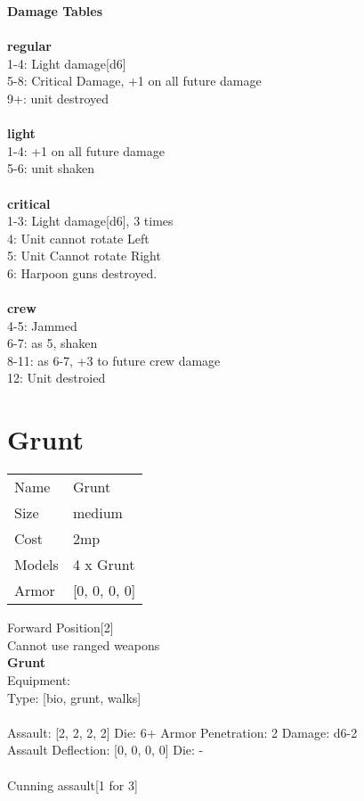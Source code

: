 {\bf Damage Tables} \\
\ \\ {\bf regular } \\
1-4: Light damage[d6] \\
5-8: Critical Damage, +1 on all future damage \\
9+: unit destroyed \\
\ \\ {\bf light } \\
1-4: +1 on all future damage \\
5-6: unit shaken \\
\ \\ {\bf critical } \\
1-3: Light damage[d6], 3 times \\
4: Unit cannot rotate Left \\
5: Unit Cannot rotate Right \\
6: Harpoon guns destroyed. \\
\ \\ {\bf crew } \\
4-5: Jammed \\
6-7: as 5, shaken \\
8-11: as 6-7, +3 to future crew damage \\
12: Unit destroied \\










\pagebreak\pagebreak

\section{ Grunt }

\begin{tabular}{ll}
  Name & Grunt \\
  Size & medium\\
  Cost & 2mp\\
  Models & 4 x Grunt\\
  Armor & [0, 0, 0, 0]\\
\end{tabular}

\noindent Forward Position[2]\\ 
Cannot use ranged weapons\\ 


{\bf Grunt } \\
Equipment:  \\
Type: [bio, grunt, walks] \\
\ \\
Assault: [2, 2, 2, 2] Die: 6+ Armor Penetration: 2 Damage: d6-2 \\
Assault Deflection: [0, 0, 0, 0] Die: -\\
\\ 
Cunning assault[1 for 3]\\ 
 
